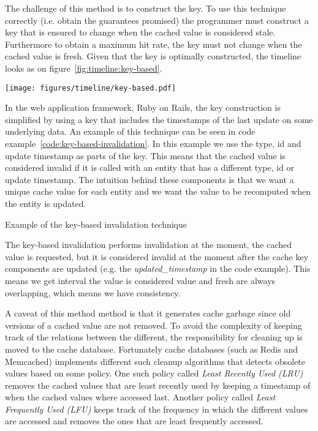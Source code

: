 The challenge of this method is to construct the key. To use this technique correctly (i.e. obtain the guarantees promised) the programmer must construct a key that is ensured to change when the cached value is considered stale. Furthermore to obtain a maximum hit rate, the key must not change when the cached value is fresh. Given that the key is optimally constructed, the timeline looks as on figure~\ref{fig:timeline:key-based}.

\begin{figure*}[ht!]
  \centering
  \texttt{[image: figures/timeline/key-based.pdf]}
  \caption{The lifecycle of the key-based invalidation technique}
  \label{fig:timeline:key-based}
\end{figure*}

In the web application framework, Ruby on Rails, the key construction is simplified by using a key that includes the timestamps of the last update on some underlying data. An example of this technique can be seen in code example~\ref{code:key-based-invalidation}. In this example we use the type, id and update timestamp as parts of the key. This means that the cached value is considered invalid if it is called with an entity that has a different type, id or update timestamp. The intuition behind these components is that we want a unique cache value for each entity and we want the value to be recomputed when the entity is updated.

\begin{code}{Example of the key-based invalidation technique}
  
  \label{code:key-based-invalidation}
\end{code}

The key-based invalidation performs invalidation at the moment, the cached value is requested, but it is considered invalid at the moment after the cache key components are updated (e.g. the \emph{updated\_timestamp} in the code example). This means we get interval the value is considered value and fresh are always overlapping, which means we have consistency.

A caveat of this method method is that it generates cache garbage since old versions of a cached value are not removed. To avoid the complexity of keeping track of the relations between the different, the responsibility for cleaning up is moved to the cache database. Fortunately cache databases (such as Redis and Memcached) implements different such cleanup algorithms that detects obsolete values based on some policy. One such policy called \emph{Least Recently Used (LRU)} removes the cached values that are least recently used by keeping a timestamp of when the cached values where accessed last. Another policy called \emph{Least Frequently Used (LFU)} keeps track of the frequency in which the different values are accessed and removes the ones that are least frequently accessed.

